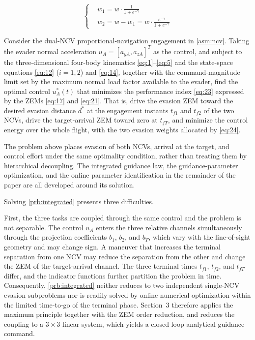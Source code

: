 \begin{equation}
\label{eq:24}
\left\{
\begin{aligned}
& {w_1} = w \cdot \frac{1}{{1 + {e^{ - \gamma }}}} \\
& {w_2} = w - {w_1} = w \cdot \frac{{{e^{ - \gamma }}}}{{1 + {e^{ - \gamma }}}}
\end{aligned}
\right.
\end{equation}
\begin{problem}
\label{prb:integrated}
Consider the dual-NCV proportional-navigation engagement in \cref{asm:ncv}. Taking the evader normal acceleration ${u_A} = {[{a_{yA}},{a_{zA}}]^T}$ as the control, and subject to the three-dimensional four-body kinematics \eqref{eq:1}--\eqref{eq:5} and the state-space equations \eqref{eq:12} ($i = 1,2$) and \eqref{eq:14}, together with the command-magnitude limit set by the maximum normal load factor available to the evader, find the optimal control $u_A^*(t)$ that minimizes the performance index \eqref{eq:23} expressed by the ZEMs \eqref{eq:17} and \eqref{eq:21}. That is, drive the evasion ZEM toward the desired evasion distance $d^*$ at the engagement instants ${t_{f1}}$ and ${t_{f2}}$ of the two NCVs, drive the target-arrival ZEM toward zero at ${t_{fT}}$, and minimize the control energy over the whole flight, with the two evasion weights allocated by \eqref{eq:24}.
\end{problem}

The problem above places evasion of both NCVs, arrival at the target, and control effort under the same optimality condition, rather than treating them by hierarchical decoupling. The integrated guidance law, the guidance-parameter optimization, and the online parameter identification in the remainder of the paper are all developed around its solution.

Solving \cref{prb:integrated} presents three difficulties.

First, the three tasks are coupled through the same control and the problem is not separable. The control ${u_A}$ enters the three relative channels simultaneously through the projection coefficients ${b_1}$, ${b_2}$, and ${b_T}$, which vary with the line-of-sight geometry and may change sign. A maneuver that increases the terminal separation from one NCV may reduce the separation from the other and change the ZEM of the target-arrival channel. The three terminal times ${t_{f1}}$, ${t_{f2}}$, and ${t_{fT}}$ differ, and the indicator functions further partition the problem in time. Consequently, \cref{prb:integrated} neither reduces to two independent single-NCV evasion subproblems nor is readily solved by online numerical optimization within the limited time-to-go of the terminal phase. Section~3 therefore applies the maximum principle together with the ZEM order reduction, and reduces the coupling to a $3 \times 3$ linear system, which yields a closed-loop analytical guidance command.

